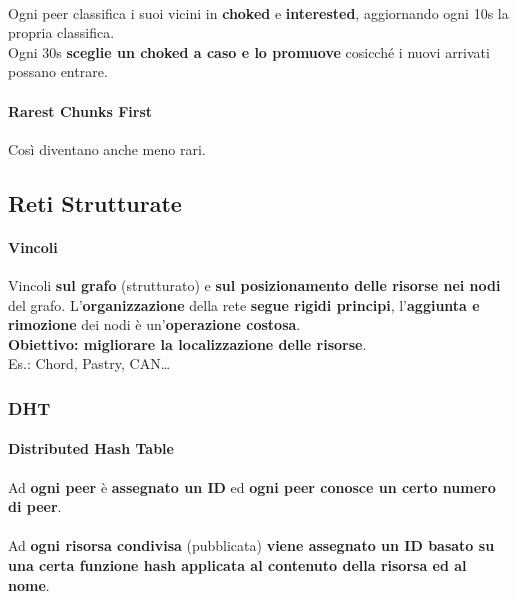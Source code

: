 \documentclass[10pt]{article}
\begin{document}
{\paragraph{} Ogni peer classifica i suoi vicini in \textbf{choked} e \textbf{interested}, aggiornando ogni 10s la propria classifica.\\
Ogni 30s \textbf{sceglie un choked a caso e lo promuove} cosicché i nuovi arrivati possano entrare.
\paragraph{Rarest Chunks First} Così diventano anche meno rari.
\pagebreak
\subsection{Reti Strutturate}
\paragraph{Vincoli} Vincoli \textbf{sul grafo} (strutturato) e \textbf{sul posizionamento delle risorse nei nodi} del grafo. L'\textbf{organizzazione} della rete \textbf{segue rigidi principi}, l'\textbf{aggiunta e rimozione} dei nodi è un'\textbf{operazione costosa}.\\
\textbf{Obiettivo: migliorare la localizzazione delle risorse}.\\
Es.: Chord, Pastry, CAN\ldots
\subsubsection{DHT}
\paragraph{Distributed Hash Table} Ad \textbf{ogni peer} è \textbf{assegnato un ID} ed \textbf{ogni peer conosce un certo numero di peer}.\\\\
Ad \textbf{ogni risorsa condivisa} (pubblicata) \textbf{viene assegnato un ID basato su una certa funzione hash applicata al contenuto della risorsa ed al nome}.
\pagebreak
}
\end{document}
